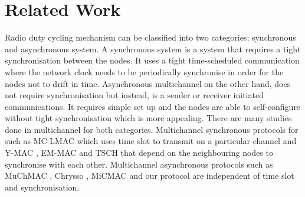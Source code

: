 \section{Related Work}
\label{sec:relatedwork}

Radio duty cycling mechanism can be classified into two categories; synchronous and asynchronous system. A synchronous system is a system that requires a tight synchronisation between the nodes. It uses a tight time-scheduled communication where the network clock needs to be periodically synchronise in order for the nodes not to drift in time. Asynchronous multichannel on the other hand, does not require synchronisation but instead, is a sender or receiver initiated communications. It requires simple set up and the nodes are able to self-configure without tight synchronisation which is more appealing. There are many studies done in multichannel for both categories. Multichannel synchronous protocols for such as MC-LMAC \cite{mc-lmac} which uses time slot to transmit on a particular channel and Y-MAC \cite{y-mac}, EM-MAC \cite{emmac} and TSCH that depend on the neighbouring nodes to synchronise with each other. Multichannel asynchronous protocols such as MuChMAC \cite{muchmac}, Chrysso \cite{chrysso}, MiCMAC \cite{micmac} and our protocol are independent of time slot and synchronisation. 


